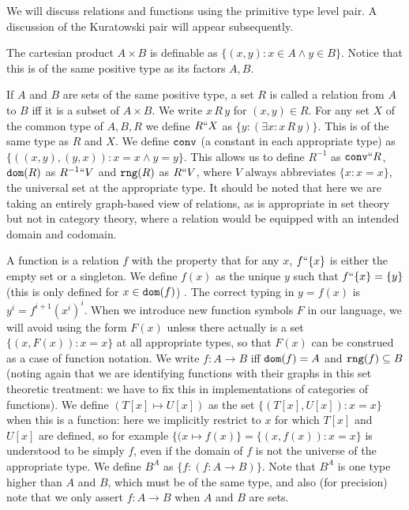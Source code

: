 \documentclass[12pt]{article}
\begin{document}
We will discuss relations and functions using the primitive type level pair.  A discussion of the Kuratowski pair will appear subsequently.

The cartesian product $A \times B$ is definable as $\{(x,y):x \in A \wedge y \in B\}$.  Notice that this is of the same positive type as its factors $A,B$.

If $A$ and $B$ are sets of the same positive type, a set $R$ is called a relation from $A$ to $B$ iff it is a subset of $A \times B$.  We write $x \,R\,y$ for $(x,y)\in R$.  For any set $X$ of the common type of $A, B, R$
we define $R``X$ as $\{y : (\exists x:x \, R\, y)\}$.  This is of the same type as $R$ and $X$.  We define ${\tt conv}$ (a constant in each appropriate type) as $\{((x,y),(y,x)):x=x \wedge y=y\}$.  This allows us to define $R^{-1}$ as ${\tt conv}``R$, ${\tt dom}(R)$ as $R^{-1}``V$ and ${\tt rng}(R)$ as $R``V$, where $V$ always abbreviates $\{x:x=x\}$, the universal set at the appropriate type.  It should be noted that here we are taking an entirely graph-based view of relations, as is appropriate in set theory but not in category theory, where a relation would be equipped with an intended domain and codomain.

A function is a relation $f$ with the property that for any $x$, $f``\{x\}$ is either the empty set or a singleton.  We define $f(x)$ as the unique $y$ such that $f``\{x\} = \{y\}$ (this is only defined for $x \in {\tt dom}(f)$) .  The correct typing in $y=f(x)$ is $y^i = f^{i+1}(x^i)^i$.  When we introduce new function symbols $F$ in our language, we will avoid using the form $F(x)$ unless there actually is a set $\{(x,F(x)):x=x\}$ at all appropriate types, so that $F(x)$ can be construed as a case of function notation.  We write $f:A \rightarrow B$ iff ${\tt dom}(f) = A$ and ${\tt rng}(f)\subseteq B$ (noting again that we are identifying functions with their graphs in this set theoretic treatment:  we have to fix this in implementations of categories of functions).  We define $(T[x] \mapsto U[x])$ as the set $\{(T[x],U[x]):x=x\}$ when this is a function:  here we implicitly restrict to $x$ for which $T[x]$ and $U[x]$ are defined, so for example $\{(x \mapsto f(x)\} = \{(x,f(x)):x=x\}$ is understood to be simply $f$, even if the domain of $f$ is not the universe of the appropriate type.  We define
$B^A$ as $\{f:(f:A \rightarrow B)\}$.  Note that $B^A$ is one type higher than $A$ and $B$, which must be of the same type, and also (for precision) note that we only
assert $f:A \rightarrow B$ when $A$ and $B$ are sets.
\end{document}
